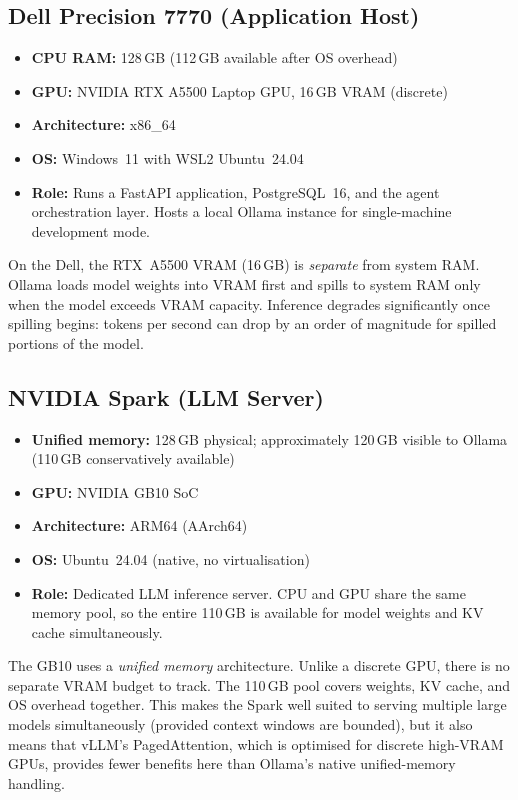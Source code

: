 \subsection{Dell Precision 7770 (Application Host)}

\begin{itemize}
  \item \textbf{CPU RAM:} 128\,GB (112\,GB available after OS overhead)
  \item \textbf{GPU:} NVIDIA RTX A5500 Laptop GPU, 16\,GB VRAM (discrete)
  \item \textbf{Architecture:} x86\_64
  \item \textbf{OS:} Windows~11 with WSL2 Ubuntu~24.04
  \item \textbf{Role:} Runs a FastAPI application,
        PostgreSQL~16, and the  agent
        orchestration layer. Hosts a local Ollama instance for
        single-machine development mode.
\end{itemize}

On the Dell, the RTX~A5500 VRAM (16\,GB) is \emph{separate} from system
RAM. Ollama loads model weights into VRAM first and spills to system RAM
only when the model exceeds VRAM capacity. Inference degrades
significantly once spilling begins: tokens per second can drop by an
order of magnitude for spilled portions of the model.

\subsection{NVIDIA Spark (LLM Server)}

\begin{itemize}
  \item \textbf{Unified memory:} 128\,GB physical; approximately 120\,GB
        visible to Ollama (110\,GB conservatively available)
  \item \textbf{GPU:} NVIDIA GB10 SoC
  \item \textbf{Architecture:} ARM64 (AArch64)
  \item \textbf{OS:} Ubuntu~24.04 (native, no virtualisation)
  \item \textbf{Role:} Dedicated LLM inference server. CPU and GPU share
        the same memory pool, so the entire 110\,GB is available for
        model weights and KV cache simultaneously.
\end{itemize}

\begin{warningbox}
The GB10 uses a \emph{unified memory} architecture. Unlike a discrete
GPU, there is no separate VRAM budget to track. The 110\,GB pool covers
weights, KV cache, and OS overhead together. This makes the Spark well
suited to serving multiple large models simultaneously (provided context
windows are bounded), but it also means that vLLM's PagedAttention,
which is optimised for discrete high-VRAM GPUs, provides fewer benefits
here than Ollama's native unified-memory handling.
\end{warningbox}

